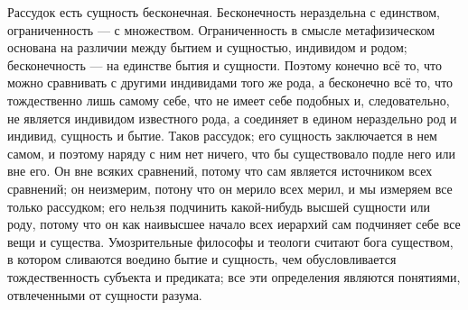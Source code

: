 \documentclass[12pt,oneside]{book}
\begin{document}
Рассудок есть сущность бесконечная. Бесконечность нераздельна с единством, ограниченность --- с множеством. Ограниченность в смысле метафизическом основана на различии между бытием и сущностью, индивидом и родом; бесконечность --- на единстве бытия и сущности. Поэтому конечно всё то, что можно сравнивать с другими индивидами того же рода, а бесконечно всё то, что тождественно лишь самому себе, что не имеет себе подобных и, следовательно, не является индивидом известного рода, а соединяет в едином нераздельно род и индивид, сущность и бытие. Таков рассудок; его сущность заключается в нем самом, и поэтому наряду с ним нет ничего, что бы существовало подле него или вне его. Он вне всяких сравнений, потому что сам является источником всех сравнений; он неизмерим, потону что он мерило всех мерил, и мы измеряем все только рассудком; его нельзя подчинить какой-нибудь высшей сущности или роду, потому что он как наивысшее начало всех иерархий сам подчиняет себе все вещи и существа. Умозрительные философы и теологи считают бога существом, в котором сливаются воедино бытие и сущность, чем обусловливается тождественность субъекта и предиката; все эти определения являются понятиями, отвлеченными от сущности разума.
\end{document}
